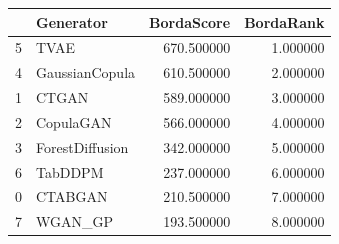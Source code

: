 \begin{tabular}{llrr}
\toprule
 & Generator & BordaScore & BordaRank \\
\midrule
5 & TVAE & 670.500000 & 1.000000 \\
4 & GaussianCopula & 610.500000 & 2.000000 \\
1 & CTGAN & 589.000000 & 3.000000 \\
2 & CopulaGAN & 566.000000 & 4.000000 \\
3 & ForestDiffusion & 342.000000 & 5.000000 \\
6 & TabDDPM & 237.000000 & 6.000000 \\
0 & CTABGAN & 210.500000 & 7.000000 \\
7 & WGAN_GP & 193.500000 & 8.000000 \\
\bottomrule
\end{tabular}
